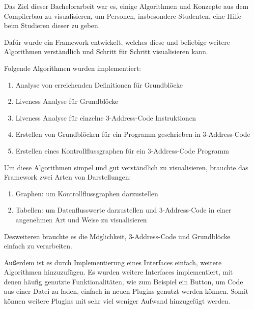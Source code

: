 Das Ziel dieser Bachelorarbeit war es,
einige Algorithmen und Konzepte
aus dem Compilerbau zu visualisieren,
um Personen, insbesondere Studenten,
eine Hilfe beim Studieren dieser zu geben.

Dafür wurde ein Framework entwickelt, welches
diese und beliebige weitere Algorithmen verständlich
und Schritt für Schritt visualisieren kann.

Folgende Algorithmen wurden implementiert:
\begin{enumerate}
  \item Analyse von erreichenden Definitionen für Grundblöcke 
  \item Liveness Analyse für Grundblöcke 
  \item Liveness Analyse für einzelne 3-Address-Code Instruktionen
  \item Erstellen von Grundblöcken für ein Programm geschrieben in 3-Address-Code
  \item Erstellen eines Kontrollflussgraphen für ein 3-Address-Code Programm
\end{enumerate}

Um diese Algorithmen simpel und gut verständlich zu visualisieren, 
brauchte das Framework zwei Arten von Darstellungen:
\begin{enumerate}
  \item Graphen: um Kontrollflussgraphen darzustellen
  \item Tabellen: um Datenflusswerte darzustellen
    und 3-Address-Code in einer angenehmen Art und Weise zu visualisieren
\end{enumerate}
Desweiteren brauchte es die Möglichkeit, 3-Address-Code
und Grundblöcke einfach zu verarbeiten.


Außerdem ist es durch Implementierung eines Interfaces einfach, 
weitere Algorithmen hinzuzufügen.
Es wurden weitere Interfaces implementiert, mit 
denen häufig genutzte Funktionalitäten, wie zum Beispiel 
ein Button, um Code aus einer Datei zu laden, einfach in neuen
Plugins genutzt werden können. Somit können weitere Plugins
mit sehr viel weniger Aufwand hinzugefügt werden.
